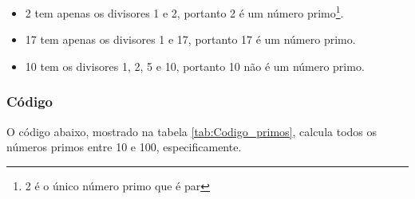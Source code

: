 \documentclass{article}
\newcommand\tab[1][0.50cm]{\hspace*{#1}}
\begin{document}
			\begin{itemize}
				\item 2 tem apenas os divisores 1 e 2, portanto 2 \'e um n\'umero primo\footnote{2 \'e o \'unico n\'umero primo que \'e par}.
				\item 17 tem apenas os divisores 1 e 17, portanto 17 \'e um n\'umero primo.
				\item 10 tem os divisores 1, 2, 5 e 10, portanto 10 n\~ao \'e um n\'umero primo.
			\end{itemize}
		
			\subsubsection[C\'odigo]{C\'odigo}
			
			\tab O c\'odigo abaixo, mostrado na tabela \ref{tab:Codigo_primos}, calcula todos os n\'umeros primos entre 10 e 100, especificamente.
				
\end{document}
